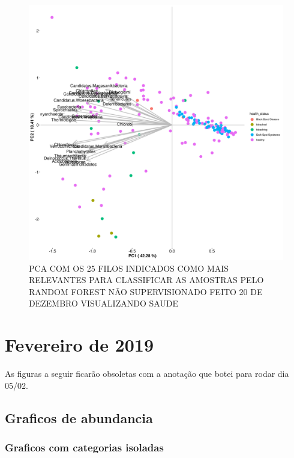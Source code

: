 \documentclass[12pt, a4paper]{report}
\begin{document}
\begin{figure}[H]
	\centering
	\includegraphics[scale=0.4]{figures/PCA_rf_nao_super_25_157_corais_health_2018_12_20.png}
	\caption{PCA COM OS 25 FILOS INDICADOS COMO MAIS RELEVANTES PARA CLASSIFICAR AS AMOSTRAS PELO RANDOM FOREST NÃO SUPERVISIONADO FEITO 20 DE DEZEMBRO VISUALIZANDO SAUDE}
	\label{fig: PCACOMOS25FILOSINDICADOSCOMOMAISRELEVANTESPARACLASSIFICARASAMOSTRASPELORANDOMFORESTNÃOSUPERVISIONADOFEITO20DEDEZEMBROVISUALIZANDOSAUDEDECORAIS}
\end{figure}

\newpage
\section{Fevereiro de 2019}

As figuras a seguir ficarão obsoletas com a anotação que botei para rodar dia 05/02. 

\subsection{Graficos de abundancia}

\subsubsection{Graficos com categorias isoladas}
\end{document}
